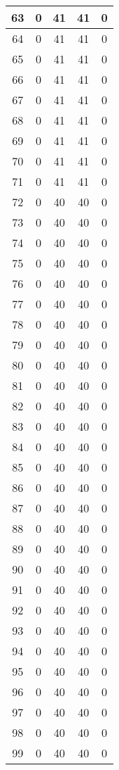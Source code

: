 \documentclass[letterpaper, 12pt]{article}
\begin{document}
\begin{longtable}{|c|c|c|c|c|}
\hline
63 & 0 & 41 & 41 & 0 \\
\hline
64 & 0 & 41 & 41 & 0 \\
\hline
65 & 0 & 41 & 41 & 0 \\
\hline
66 & 0 & 41 & 41 & 0 \\
\hline
67 & 0 & 41 & 41 & 0 \\
\hline
68 & 0 & 41 & 41 & 0 \\
\hline
69 & 0 & 41 & 41 & 0 \\
\hline
70 & 0 & 41 & 41 & 0 \\
\hline
71 & 0 & 41 & 41 & 0 \\
\hline
72 & 0 & 40 & 40 & 0 \\
\hline
73 & 0 & 40 & 40 & 0 \\
\hline
74 & 0 & 40 & 40 & 0 \\
\hline
75 & 0 & 40 & 40 & 0 \\
\hline
76 & 0 & 40 & 40 & 0 \\
\hline
77 & 0 & 40 & 40 & 0 \\
\hline
78 & 0 & 40 & 40 & 0 \\
\hline
79 & 0 & 40 & 40 & 0 \\
\hline
80 & 0 & 40 & 40 & 0 \\
\hline
81 & 0 & 40 & 40 & 0 \\
\hline
82 & 0 & 40 & 40 & 0 \\
\hline
83 & 0 & 40 & 40 & 0 \\
\hline
84 & 0 & 40 & 40 & 0 \\
\hline
85 & 0 & 40 & 40 & 0 \\
\hline
86 & 0 & 40 & 40 & 0 \\
\hline
87 & 0 & 40 & 40 & 0 \\
\hline
88 & 0 & 40 & 40 & 0 \\
\hline
89 & 0 & 40 & 40 & 0 \\
\hline
90 & 0 & 40 & 40 & 0 \\
\hline
91 & 0 & 40 & 40 & 0 \\
\hline
92 & 0 & 40 & 40 & 0 \\
\hline
93 & 0 & 40 & 40 & 0 \\
\hline
94 & 0 & 40 & 40 & 0 \\
\hline
95 & 0 & 40 & 40 & 0 \\
\hline
96 & 0 & 40 & 40 & 0 \\
\hline
97 & 0 & 40 & 40 & 0 \\
\hline
98 & 0 & 40 & 40 & 0 \\
\hline
99 & 0 & 40 & 40 & 0 \\

\end{longtable}
\end{document}
